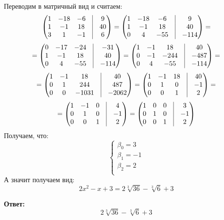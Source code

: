 \documentclass[a4paper,12pt]{article}
\begin{document}
Переводим в матричный вид и считаем:
\[
\begin{pmatrix}
1 & -18 & -6 & \vrule &9 \\
1 & -1 & 18 & \vrule &40  \\
3 & 1 & -1 & \vrule &6 \\
\end{pmatrix}
=
\begin{pmatrix}
1 & -18 & -6 & \vrule &9 \\
1 & -1 & 18 & \vrule &40 \\
0 & 4 & -55 & \vrule &-114  \\
\end{pmatrix}
=
\]
\[
=
\begin{pmatrix}
0 & -17 & -24 & \vrule &-31  \\
1 & -1 & 18 & \vrule &40 \\
0 & 4 & -55 & \vrule &-114  \\
\end{pmatrix}
=
\begin{pmatrix}
1 & -1 & 18 & \vrule &40  \\
0 & -1 & -244 & \vrule &-487 \\
0 & 4 & -55 & \vrule &-114  \\
\end{pmatrix}
=
\]
\[
=
\begin{pmatrix}
1 & -1 & 18 & \vrule &40  \\
0 & 1 & 244 & \vrule &487 \\
0 & 0 & -1031 & \vrule &-2062  \\
\end{pmatrix}
=
\begin{pmatrix}
1 & -1 & 18 & \vrule &40  \\
0 & 1 & 0 & \vrule &-1  \\
0 & 0 & 1 & \vrule &2 \\
\end{pmatrix}
=
\]
\[
=
\begin{pmatrix}
1 & -1 & 0 & \vrule &4  \\
0 & 1 & 0 & \vrule &-1  \\
0 & 0 & 1 & \vrule &2  \\
\end{pmatrix}
=
\begin{pmatrix}
1 & 0 & 0 & \vrule &3 \\
0 & 1 & 0 & \vrule &-1  \\
0 & 0 & 1 & \vrule &2 \\
\end{pmatrix}
\]
Получаем, что:
\[
\begin{cases}
\beta_0 = 3\\
\beta_1 = -1\\
\beta_2 = 2\\
\end{cases}
\]
А значит получаем вид:
\[
2x^2 - x + 3 = 2 \sqrt[3]{36} - \sqrt[3]{6} + 3
\]
\begin{center}
\textbf{Ответ: } 
\[
2 \sqrt[3]{36} - \sqrt[3]{6} + 3
\]
\end{center}
\end{document}

